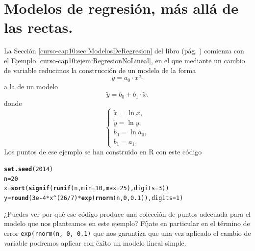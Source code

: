 \documentclass[10pt,a4paper]{article}\usepackage[]{graphicx}\usepackage[]{color}
\makeatletter
\newcommand{\hlnum}[1]{\textcolor[rgb]{0.686,0.059,0.569}{#1}}%
\newcommand{\hlopt}[1]{\textcolor[rgb]{0,0,0}{#1}}%
\newcommand{\hlstd}[1]{\textcolor[rgb]{0.345,0.345,0.345}{#1}}%
\newcommand{\hlkwb}[1]{\textcolor[rgb]{0.69,0.353,0.396}{#1}}%
\newcommand{\hlkwc}[1]{\textcolor[rgb]{0.333,0.667,0.333}{#1}}%
\newcommand{\hlkwd}[1]{\textcolor[rgb]{0.737,0.353,0.396}{\textbf{#1}}}%
\newenvironment{kframe}{%
 \def\at@end@of@kframe{}%
 \ifinner\ifhmode%
  \def\at@end@of@kframe{\end{minipage}}%
  \begin{minipage}{\columnwidth}%
 \fi\fi%
 \def\FrameCommand##1{\hskip\@totalleftmargin \hskip-\fboxsep
 \colorbox{shadecolor}{##1}\hskip-\fboxsep
     \hskip-\linewidth \hskip-\@totalleftmargin \hskip\columnwidth}%
 \MakeFramed {\advance\hsize-\width
   \@totalleftmargin\z@ \linewidth\hsize
   \@setminipage}}%
 {\par\unskip\endMakeFramed%
 \at@end@of@kframe}
\newenvironment{knitrout}{}{} %
\makeatother
\begin{document}
\section{Modelos de regresión, más allá de las rectas.}

La Sección \ref{curso-cap10:sec:ModelosDeRegresion} del libro (pág. \pageref{curso-cap10:sec:ModelosDeRegresion}) comienza con el Ejemplo \ref{curso-cap10:ejem:RegresionNoLineal}, en el que mediante un cambio de variable reducimos la construcción de un modelo de la forma
\[  y=a_0\cdot x^{a_1}\]
a la de un modelo
\[\tilde y=b_0+b_1\cdot\tilde x.\]
donde
\[
\begin{cases}
\tilde x=\ln x,\\
\tilde y=\ln y,\\
b_0=\ln a_0,\\
b_1=a_1,
\end{cases}
\]
Los puntos de ese ejemplo se han construido en R con este código
\begin{knitrout}
\color{fgcolor}\begin{kframe}
\begin{alltt}
\hlkwd{set.seed}\hlstd{(}\hlnum{2014}\hlstd{)}
\hlstd{n}\hlkwb{=}\hlnum{20}
\hlstd{x}\hlkwb{=}\hlkwd{sort}\hlstd{(}\hlkwd{signif}\hlstd{(}\hlkwd{runif}\hlstd{(n,}\hlkwc{min}\hlstd{=}\hlnum{10}\hlstd{,}\hlkwc{max}\hlstd{=}\hlnum{25}\hlstd{),}\hlkwc{digits}\hlstd{=}\hlnum{3}\hlstd{))}
\hlstd{y}\hlkwb{=}\hlkwd{round}\hlstd{(}\hlnum{3e-4} \hlopt{*} \hlstd{x}\hlopt{^}\hlstd{(}\hlnum{26}\hlopt{/}\hlnum{7}\hlstd{)} \hlopt{*} \hlkwd{exp}\hlstd{(}\hlkwd{rnorm}\hlstd{(n,} \hlnum{0}\hlstd{,} \hlnum{0.1}\hlstd{)),}\hlkwc{digits}\hlstd{=}\hlnum{1}\hlstd{)}
\end{alltt}
\end{kframe}
\end{knitrout}
¿Puedes ver por qué ese código produce una colección de puntos adecuada para el modelo que nos planteamos en este ejemplo? Fíjate en particular en el término de error {\tt exp(rnorm(n, 0, 0.1)} que nos garantiza que una vez aplicado el cambio de variable podremos aplicar con éxito un modelo lineal simple.
\end{document}

